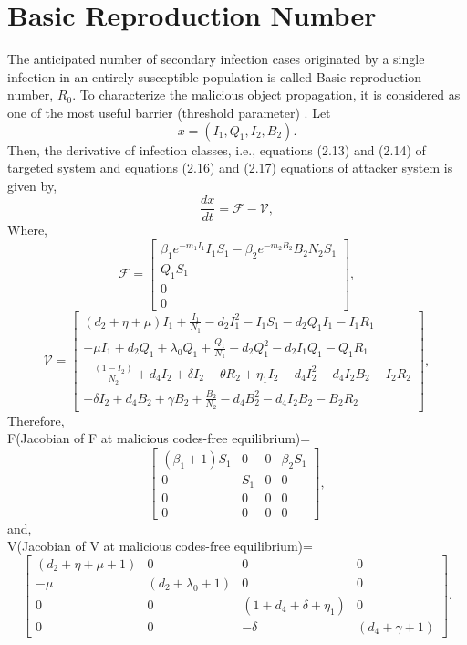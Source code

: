 \section{Basic Reproduction Number}
The anticipated number of secondary infection cases
 originated by a single infection in an entirely susceptible population is called Basic reproduction number, $R_0$. To
 characterize the malicious object propagation, it is considered as one of the most useful
 barrier (threshold parameter) \cite{edtr18}.
Let
\begin{equation*} x= ( I_1, Q_1, I_2, B_2 ).\end{equation*}
 Then, the derivative of infection classes, i.e., equations (2.13)
 and (2.14) of targeted system and equations (2.16)
 and (2.17) equations of attacker system is given by,
\begin{equation}\frac{d x}{d t} =\mathcal F -\mathcal V,\end{equation}
Where,
\[
\mathcal F=
\begin{bmatrix}
\beta_1 e^{-m_1 I_1} I_1 S_1- \beta_2 e^{-m_2 B_2} B_2 N_2 S_1 \\
Q_1 S_1 \\
0 \\
0
\end{bmatrix},
\]
\[
\mathcal V=
\begin{bmatrix}
( d_2+ \eta + \mu) I_1+ \frac{ I_1}{N_1}-d_2 I_1^2- I_1 S_1-d_2 Q_1 I_1-I_1 R_1\\
- \mu I_1 + d_2 Q_1 + \lambda_0 Q_1+ \frac{ Q_1}{N_1}-d_2 Q_1^2-d_2 I_1 Q_1-Q_1 R_1\\
- \frac{( 1- I_2)}{N_2}+ d_4 I_2+\delta I_2 - \theta R_2 +\eta_1 I_2- d_4 I_2^2-d_4 I_2 B_2- I_2 R_2\\
-\delta I_2 + d_4 B_2 +\gamma B_2+ \frac{ B_2}{N_2}-d_4 B_2^2-d_4 I_2 B_2- B_2 R_2
\end{bmatrix},
\]
Therefore,\\
F(Jacobian of F at malicious codes-free equilibrium)=
\[
\begin{bmatrix}
(\beta_1+1) S_1 & 0 & 0 & \beta_2 S_1 \\
0 & S_1 & 0 & 0 \\
0 & 0 & 0 & 0 \\
0 & 0 & 0 & 0
\end{bmatrix},
\]
and,\\
V(Jacobian of V at malicious codes-free equilibrium)=
\[
\begin{bmatrix}
( d_2+ \eta + \mu+1) & 0 & 0 & 0 \\
-\mu & (d_2+\lambda_0+1) & 0 & 0 \\
0 & 0 & (1+d_4+\delta+\eta_1) & 0 \\
0 & 0 & -\delta & (d_4+\gamma+1)
\end{bmatrix}.
\]
